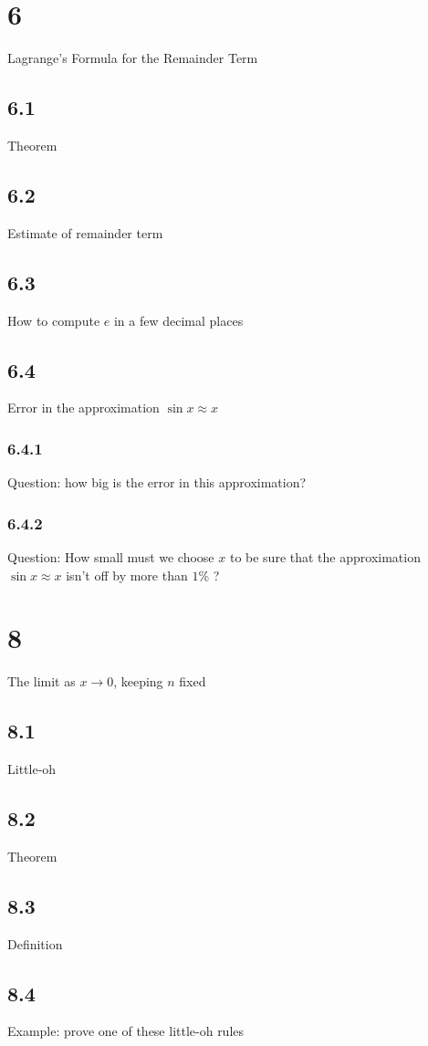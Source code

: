 \section{6}{Lagrange's Formula for the Remainder Term}
\subsection{6.1}{Theorem}
\subsection{6.2}{Estimate of remainder term}
\subsection{6.3}{How to compute $e$ in a few decimal places}
\subsection{6.4}{Error in the approximation $\sin x\approx x$}
\subsubsection{6.4.1}{Question: how big is the error in this approximation?}
\subsubsection{6.4.2}{Question: How small must we choose $x$ to be sure that the approximation $\sin x\approx x$ isn't off by more than $1$\% ?}

\section{8}{The limit as $x\to 0$, keeping $n$ fixed }
\subsection{8.1}{Little-oh}
\subsection{8.2}{Theorem}
\subsection{8.3}{Definition}
\subsection{8.4}{Example: prove one of these little-oh rules}
